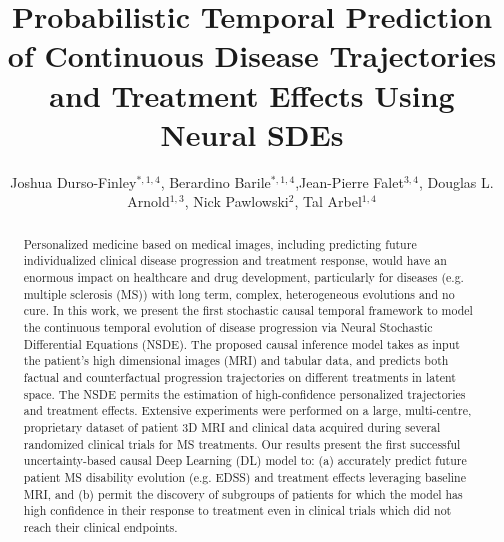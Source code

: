 \documentclass[runningheads]{llncs}
\title{Probabilistic Temporal Prediction of Continuous Disease Trajectories and Treatment Effects Using Neural SDEs}
\author{Joshua Durso-Finley$^{*,1,4}$, Berardino Barile$^{*,1,4}$,Jean-Pierre Falet$^{3,4}$, Douglas L. Arnold$^{1,3}$, Nick Pawlowski$^2$, Tal Arbel$^{1,4}$}
\institute{$^1$Center for Intelligent Machines, McGill University. $^2$Microsoft Research. $^3$Montreal Neurological Institute, McGill University. $^4$MILA (Quebec AI institute).\\
$^{*}$ These authors contributed equally}
\begin{document}
\maketitle
\begin{abstract}

Personalized medicine based on medical images, including predicting future individualized clinical disease progression and treatment response, would have an enormous impact on healthcare and drug development, particularly for diseases (e.g. multiple sclerosis (MS)) with long term, complex, heterogeneous evolutions and no cure.  In this work, we present the first stochastic causal temporal framework to model the continuous temporal evolution of disease progression via Neural Stochastic Differential Equations (NSDE). The proposed causal inference model takes as input the patient's high dimensional images (MRI) and tabular data, and predicts both factual and counterfactual progression trajectories on different treatments in latent space. The NSDE permits the estimation of high-confidence personalized trajectories and treatment effects. Extensive experiments were performed on a large, multi-centre, proprietary dataset of patient 3D MRI and clinical data acquired during several randomized clinical trials for MS treatments. Our results present the first successful uncertainty-based causal Deep Learning (DL) model to: (a) accurately predict future patient MS disability evolution (e.g. EDSS) and treatment effects leveraging baseline MRI, and (b) permit the discovery of subgroups of patients for which the model has high confidence in their response to treatment even in clinical trials which did not reach their clinical endpoints.
\end{abstract}
\end{document}
